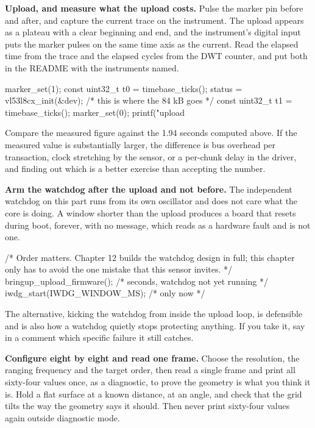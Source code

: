 \begin{steps}
\item \textbf{Upload, and measure what the upload costs.} Pulse the marker pin
before and after, and capture the current trace on the instrument. The upload
appears as a plateau with a clear beginning and end, and the instrument's
digital input puts the marker pulses on the same time axis as the current. Read
the elapsed time from the trace and the elapsed cycles from the DWT counter, and
put both in the README with the instruments named.
\begin{ccode}
marker_set(1);
const uint32_t t0 = timebase_ticks();
status = vl53l8cx_init(&dev);          /* this is where the 84 kB goes */
const uint32_t t1 = timebase_ticks();
marker_set(0);
printf("upload %
\end{ccode}
Compare the measured figure against the 1.94 seconds computed above. If the
measured value is substantially larger, the difference is bus overhead per
transaction, clock stretching by the sensor, or a per-chunk delay in the driver,
and finding out which is a better exercise than accepting the number.

\item \textbf{Arm the watchdog after the upload and not before.} The independent
watchdog on this part runs from its own oscillator and does not care what the
core is doing. A window shorter than the upload produces a board that resets
during boot, forever, with no message, which reads as a hardware fault and is
not one.
\begin{ccode}
/* Order matters. Chapter 12 builds the watchdog design in full; this
   chapter only has to avoid the one mistake that this sensor invites. */
bringup_upload_firmware();      /* seconds, watchdog not yet running */
iwdg_start(IWDG_WINDOW_MS);     /* only now */
\end{ccode}
The alternative, kicking the watchdog from inside the upload loop, is defensible
and is also how a watchdog quietly stops protecting anything. If you take it,
say in a comment which specific failure it still catches.

\item \textbf{Configure eight by eight and read one frame.} Choose the
resolution, the ranging frequency and the target order, then read a single frame
and print all sixty-four values once, as a diagnostic, to prove the geometry is
what you think it is. Hold a flat surface at a known distance, at an angle, and
check that the grid tilts the way the geometry says it should. Then never print
sixty-four values again outside diagnostic mode.


\end{steps}

